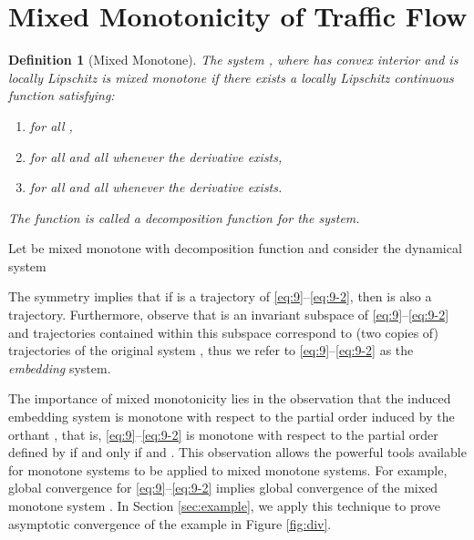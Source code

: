 \documentclass[letterpaper, 10 pt, conference]{ieeeconf}
\newtheorem{definition}{Definition}
\begin{document}
\section{Mixed Monotonicity of Traffic Flow}
\label{sec:mixed-monot-traff}
\begin{definition}[Mixed Monotone]
\label{def:cwmm}
The system ,  where  has convex interior and  is locally Lipschitz is \emph{mixed monotone} if there exists a locally Lipschitz continuous function  satisfying:
\begin{enumerate}
\item  for all ,\\
\item  for all  and all   whenever the derivative exists,\\
\item  for all  and all   whenever the derivative exists.
\end{enumerate}
The function  is called a \emph{decomposition function} for the system.
\end{definition}


Let  be mixed monotone with decomposition function  and consider the dynamical system

The symmetry implies that if  is a trajectory of \eqref{eq:9}--\eqref{eq:9-2}, then  is also a trajectory.  Furthermore, observe that  is an invariant subspace of \eqref{eq:9}--\eqref{eq:9-2} and trajectories contained within this subspace correspond to (two copies of) trajectories of the original system , thus we refer to \eqref{eq:9}--\eqref{eq:9-2} as the \emph{embedding} system.


The importance of mixed monotonicity lies in the observation that the induced embedding system is monotone with respect to the partial order induced by the orthant , that is, \eqref{eq:9}--\eqref{eq:9-2}  is monotone with respect to the partial order  defined by  if and only if  and . This observation allows the powerful tools available for monotone systems to be applied to mixed monotone systems. For example, global convergence for \eqref{eq:9}--\eqref{eq:9-2} implies global convergence of the mixed monotone system . In Section \ref{sec:example}, we apply this technique to prove asymptotic convergence of the example in Figure \ref{fig:div}.
\end{document}
